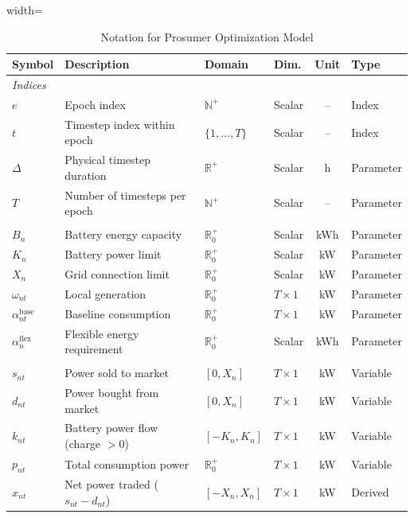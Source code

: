 \documentclass[12pt, notitlepage]{article}
\begin{document}
\begin{table}[h!]
\centering
\caption{Notation for Prosumer Optimization Model}
\label{tab:prosumer_notation}
\begin{adjustbox}{width=\textwidth} %
\begin{threeparttable}
\begin{tabular}{@{}llllcl@{}}
\toprule
Symbol & Description & Domain & Dim. & Unit & Type \\
\midrule
\multicolumn{6}{l}{\textit{Indices}} \\
$e$ & Epoch index & $\mathbb{N}^+$ & Scalar & -- & Index \\
$t$ & Timestep index within epoch & $\{1, \dots, T\}$ & Scalar & -- & Index \\
$\Delta$ & Physical timestep duration & $\mathbb{R}^+$ & Scalar & h & Parameter \\
$T$ & Number of timesteps per epoch & $\mathbb{N}^+$ & Scalar & -- & Parameter \\
\addlinespace
\multicolumn{6}{l}{\textit{Prosumer Parameters}} \\
$B_n$ & Battery energy capacity & $\mathbb{R}^+_0$ & Scalar & kWh & Parameter \\
$K_n$ & Battery power limit & $\mathbb{R}^+_0$ & Scalar & kW & Parameter \\
$X_n$ & Grid connection limit & $\mathbb{R}^+_0$ & Scalar & kW & Parameter \\
$\omega_{nt}$ & Local generation & $\mathbb{R}^+_0$ & $T \times 1$ & kW & Parameter \\
$\alpha^{\text{base}}_{nt}$ & Baseline consumption & $\mathbb{R}^+_0$ & $T \times 1$ & kW & Parameter \\
$\alpha^{\text{flex}}_{n}$ & Flexible energy requirement & $\mathbb{R}^+_0$ & Scalar & kWh & Parameter \\
\addlinespace
\multicolumn{6}{l}{\textit{Control Variables}} \\
$s_{nt}$ & Power sold to market & $[0, X_n]$ & $T \times 1$ & kW & Variable \\
$d_{nt}$ & Power bought from market & $[0, X_n]$ & $T \times 1$ & kW & Variable \\
$k_{nt}$ & Battery power flow (charge $>0$) & $[-K_n, K_n]$ & $T \times 1$ & kW & Variable \\
$p_{nt}$ & Total consumption power & $\mathbb{R}^+_0$ & $T \times 1$ & kW & Variable \\
$x_{nt}$ & Net power traded ($s_{nt}-d_{nt}$) & $[-X_n, X_n]$ & $T \times 1$ & kW & Derived \\

\end{tabular}
\end{threeparttable}
\end{adjustbox}
\end{table}
\end{document}
